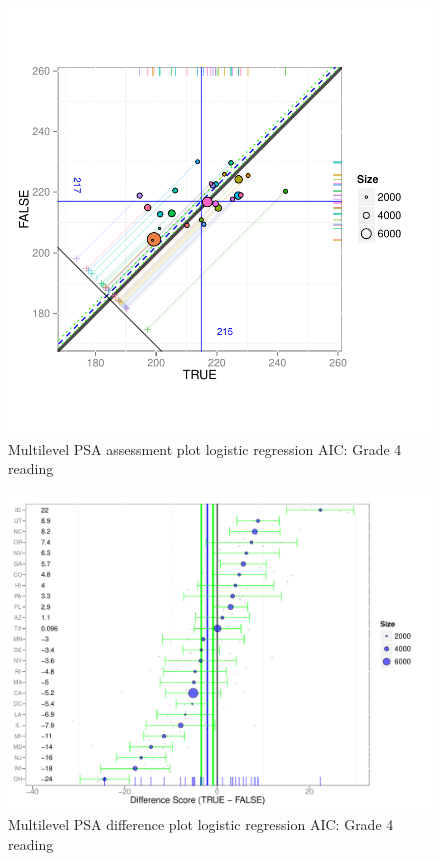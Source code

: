 \begin{figure}[h!]
\begin{center}
\includegraphics[width=\textwidth]{../Figures2009/g4read-mlpsa-lrAIC-circ.pdf}
\caption{Multilevel PSA assessment plot logistic regression AIC: Grade 4 reading}
\end{center}
\end{figure}

\begin{figure}[h!]
\begin{center}
\includegraphics[width=\textwidth]{../Figures2009/g4read-mlpsa-lrAIC-diff.pdf}
\caption{Multilevel PSA difference plot logistic regression AIC: Grade 4 reading}
\end{center}
\end{figure}

